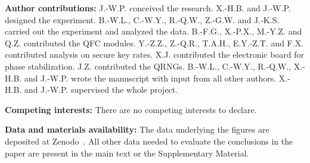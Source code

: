 \documentclass[aps,reprint,showpacs,superscriptaddress]{revtex4-2}
\begin{document}
\textbf{Author contributions:}
J.-W.P. conceived the research. X.-H.B. and J.-W.P. designed the experiment. B.-W.L., C.-W.Y., R.-Q.W., Z.-G.W. and J.-K.S. carried out the experiment and analyzed the data. B.-F.G., X.-P.X., M.-Y.Z. and Q.Z. contributed the QFC modules. Y.-Z.Z., Z.-Q.R., T.A.H., E.Y.-Z.T. and F.X. contributed analysis on secure key rates. X.J. contributed the electronic board for phase stabilization. J.Z. contributed the QRNGs. B.-W.L., C.-W.Y., R.-Q.W., X.-H.B. and J.-W.P. wrote the manuscript with input from all other authors. X.-H.B. and J.-W.P. supervised the whole project.

\textbf{Competing interests:}
There are no competing interests to declare.

\textbf{Data and materials availability:} The data underlying the figures are deposited at Zenodo~\cite{Zenodo}. All other data needed to evaluate the conclusions in the paper are present in the main text or the Supplementary Material.
\end{document}
